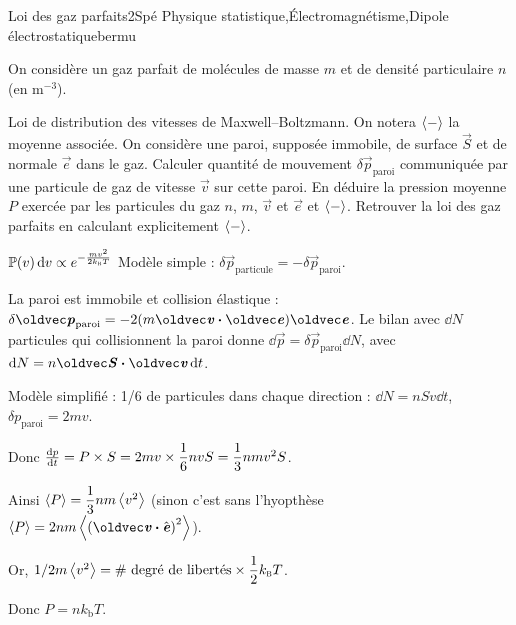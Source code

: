 

\begin{exercise}{Loi des gaz parfaits}{2}{Spé}
{Physique statistique,\'Electromagnétisme,Dipole électrostatique}{bermu}

On considère un gaz parfait de molécules de masse $m$ et de densité particulaire $n$ (en m$^{-3}$).

\begin{questions}
    \questioncours Loi de distribution des vitesses de Maxwell--Boltzmann. On notera $\ev{-}$ la moyenne associée.
    \question On considère une paroi, supposée immobile, de surface $\vec{S}$ et de normale $\vec{e}$ dans le gaz. Calculer quantité de mouvement $\delta\vec{p}_\text{paroi}$ communiquée par une particule de gaz de vitesse $\vec{v}$ sur cette paroi.
    \question En déduire la pression moyenne $P$ exercée par les particules du gaz $n$, $m$, $\vec{v}$ et $\vec{e}$ et $\ev{-}$.
    \question Retrouver la loi des gaz parfaits en calculant explicitement $\ev{-}$.
\end{questions}


\end{exercise}

\begin{solution}
\begin{questions}
    \questioncours $\mathbb{P}(v)\dd{v} \propto e^{-\frac{m v^2}{2 k_\textsc{b} T}}$
    \question Modèle simple : $\delta \vec{p}_\text{particule} = -\delta \vec{p}_\text{paroi}$.

    La paroi est immobile et collision élastique : $\delta \vec{p}_\text{paroi} = -2(m\vv\vdot\vec{e})\vec{e}$.
    \question Le bilan avec $\dd{N}$ particules qui collisionnent la paroi donne
    $\dd{\vec{p}} = \delta\vec{p}_\text{paroi}\dd{N}$, avec $\dd{N} = n \vec{S}\vdot\vv\dd{t}$.

    Modèle simplifié : 1/6 de particules dans chaque direction : $\dd{N} = n S v\dd{t}$, $\delta p_\text{paroi} = 2 m v$.

    Donc $\dv{p}{t} = P\times S =  2 m v \times \dfrac{1}{6} n v S = \dfrac{1}{3} n m v^2 S$.

    Ainsi $\ev{P} = \dfrac{1}{3} n m \ev{v^2}$ (sinon c'est sans l'hyopthèse $\ev{P} = 2 n m \ev{\qty(\vv\vdot\ve)^2}$).
    
    \question Or, $1/2 m\ev{v^2} = \#\text{ degré de libertés} \times \dfrac{1}{2} k_\textsc{b}T$.

    Donc $P = n k_\text{b}T$.
\end{questions}
\end{solution}


